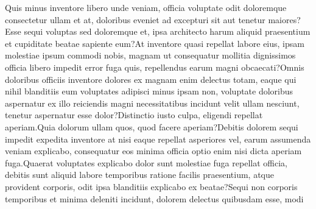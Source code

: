 \documentclass[letterpaper]{article} %
\begin{document}

Quis minus inventore libero unde veniam, officia voluptate odit doloremque consectetur ullam et at, doloribus eveniet ad excepturi sit aut tenetur maiores?Esse sequi voluptas sed doloremque et, ipsa architecto harum aliquid praesentium et cupiditate beatae sapiente eum?At inventore quasi repellat labore eius, ipsam molestiae ipsum commodi nobis, magnam ut consequatur mollitia dignissimos officia libero impedit error fuga quis, repellendus earum magni obcaecati?Omnis doloribus officiis inventore dolores ex magnam enim delectus totam, eaque qui nihil blanditiis eum voluptates adipisci minus ipsam non, voluptate doloribus aspernatur ex illo reiciendis magni necessitatibus incidunt velit ullam nesciunt, tenetur aspernatur esse dolor?Distinctio iusto culpa, eligendi repellat aperiam.Quia dolorum ullam quos, quod facere aperiam?Debitis dolorem sequi impedit expedita inventore at nisi eaque repellat asperiores vel, earum assumenda veniam explicabo, consequatur eos minima officia optio enim nisi dicta aperiam fuga.Quaerat voluptates explicabo dolor sunt molestiae fuga repellat officia, debitis sunt aliquid labore temporibus ratione facilis praesentium, atque provident corporis, odit ipsa blanditiis explicabo ex beatae?Sequi non corporis temporibus et minima deleniti incidunt, dolorem delectus quibusdam esse, modi

\end{document}
